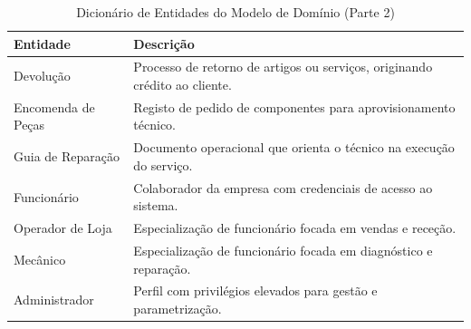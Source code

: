 \documentclass[a4paper,12pt]{scrreprt}
\begin{document}
    \begin{table}[H]
        \centering
        \renewcommand{\arraystretch}{1.5}
        \begin{tabular}{|p{}|p{}|}
            \hline
            \rowcolor{gray!20} \textbf{Entidade} & \textbf{Descrição} \\ \hline
 
            Devolução & Processo de retorno de artigos ou serviços, originando crédito ao cliente. \\ \hline 
            Encomenda de Peças & Registo de pedido de componentes para aprovisionamento técnico. \\ \hline 
            Guia de Reparação & Documento operacional que orienta o técnico na execução do serviço. \\ \hline 
            Funcionário & Colaborador da empresa com credenciais de acesso ao sistema. \\ \hline 
            Operador de Loja & Especialização de funcionário focada em vendas e receção. \\ \hline
            Mecânico & Especialização de funcionário focada em diagnóstico e reparação. \\ \hline 
            Administrador & Perfil com privilégios elevados para gestão e parametrização. \\ \hline 
        \end{tabular}
        \caption{Dicionário de Entidades do Modelo de Domínio (Parte 2)}
        \label{tab:entidades_pt2}
    \end{table}
\end{document}
